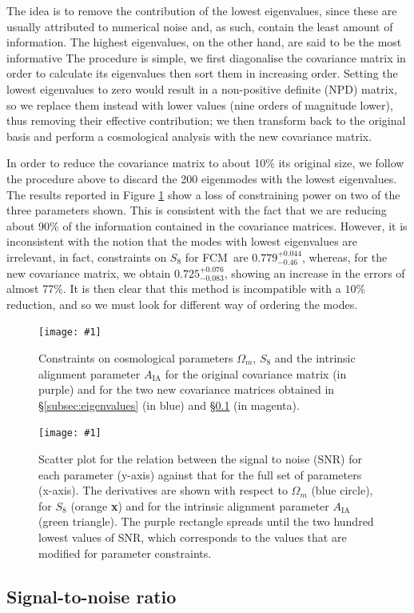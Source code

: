 \documentclass[twocolumn,nofootinbib]{\docclass}
\newcommand{\sfig}[2]{
	\texttt{[image: \#1]}
}
\newcommand{\Sfig}[2]{
	\begin{figure}[thbp]
		\sfig{../figures/#1.pdf}{\columnwidth}
		\caption{{\small #2}}
		\label{fig:#1}
	\end{figure}
}
\newcommand{\Svwide}[2]{
	\begin{figure}[thbp]
		\sfig{../figures/#1.pdf}{\textwidth}
		\caption{{\small #2}}
		\label{fig:#1}
	\end{figure}
}
\newcommand{\rf}[1]{Figure \ref{fig:#1}}
\newcommand{\rssec}[1]{\S\ref{subsec:#1}}
\newcommand\full{FCM}
\begin{document}
	The idea is to remove the contribution of the lowest eigenvalues, since these are usually attributed to numerical noise and, as such, contain the least amount of information. The highest eigenvalues, on the other hand, are said to be the most informative \cite{Vogeley:1996} The procedure is simple, we first diagonalise the covariance matrix in order to calculate its eigenvalues then sort them in increasing order. Setting the lowest eigenvalues to zero would result in a non-positive definite (NPD) matrix, so we replace them instead with lower values (nine orders of magnitude lower), thus removing their effective contribution; we then transform back to the original basis and perform a cosmological analysis with the new covariance matrix.
	
	In order to reduce the covariance matrix to about 10\% its original size, we follow the procedure above to discard the 200 eigenmodes with the lowest eigenvalues. The results reported in \rf{EigSNR-constraints_wmS8A} show a loss of constraining power on two of the three parameters shown. This is consistent with the fact that we are reducing about 90\% of the information contained in the covariance matrices. However, it is inconsistent with the notion that the modes with lowest eigenvalues are irrelevant, in fact, constraints on $S_8$ for \full\ are $0.779^{+ 0.044}_{- 0.46}$, whereas, for the new covariance matrix, we obtain $0.725^{+ 0.076}_{- 0.083}$, showing an increase in the errors of almost 77\%. 
	It is then clear that this method is incompatible with a $10\%$ reduction, and so we must look for different way of ordering the modes.
	
	\Sfig{EigSNR-constraints_wmS8A}{Constraints on cosmological parameters $\Omega_m$, $S_8$ and the intrinsic alignment parameter $A_{\mathrm{IA}}$ for the original covariance matrix (in purple) and for the two new covariance matrices obtained in \rssec{eigenvalues} (in blue) and \rssec{snr} (in magenta).}
	
	\Svwide{SNR_cuts200}{Scatter plot for the relation between the signal to noise (SNR)  for each parameter (y-axis) against that for the full set of parameters (x-axis). The derivatives are shown with respect to $\Omega_m$ (blue circle), for $S_8$ (orange \textbf{x}) and for the intrinsic alignment parameter $A_{\mathrm{IA}}$ (green triangle). The purple rectangle spreads until the two hundred lowest values of SNR, which corresponds to the values that are modified for parameter constraints.}
	
	\subsection{Signal-to-noise ratio}
	\label{subsec:snr}
	
\end{document}
